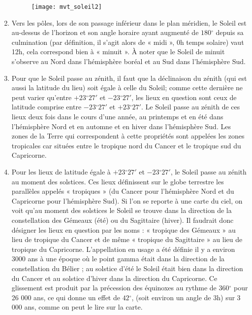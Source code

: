 \documentclass[a4paper,10pt]{report}
\renewcommand{\deg}{\ensuremath{^{\circ}}}
\begin{document}
\begin{Answer}
\begin{enumerate}
    \begin{figure}%
      \centering
      \texttt{[image: mvt\_soleil2]}
      \label{mvtsolaire2}
      \caption{}
    \end{figure}

  \item Vers les pôles, lors de son passage inférieur dans le plan
    méridien, le Soleil est au-dessus de l'horizon et son angle
    horaire ayant augmenté de $180\deg$ depuis sa culmination (par
    définition, il s'agit alors de « midi », 0h temps solaire) vaut
    12h, cela correspond bien à « minuit ». À noter que le Soleil de
    minuit s'observe au Nord dans l'hémisphère boréal et au Sud dans
    l'hémisphère Sud.

  \item Pour que le Soleil passe au zénith, il faut que la déclinaison
    du zénith (qui est aussi la latitude du lieu) soit égale à celle
    du Soleil; comme cette dernière ne peut varier qu'entre
    $+23\deg27'$ et $-23\deg27'$, les lieux en question sont ceux
    de latitude comprise entre $-23\deg27'$ et $+23\deg27'$. Le
    Soleil passe au zénith de ces lieux deux fois dans le cours d'une
    année, au printemps et en été dans l'hémisphère Nord et en automne
    et en hiver dans l'hémisphère Sud. Les zones de la Terre qui
    correspondent à cette propriétés sont appelées les zones
    tropicales car situées entre le tropique nord du Cancer et le
    tropique sud du Capricorne.

  \item Pour les lieux de latitude égale à $+23\deg27'$ et
    $-23\deg27'$, le Soleil passe au zénith au moment des
    solstices. Ces lieux définissent sur le globe terrestre les
    parallèles appelés « tropiques » (du Cancer pour l'hémisphère Nord
    et du Capricorne pour l'hémisphère Sud). Si l'on se reporte à une
    carte du ciel, on voit qu'au moment des solstices le Soleil se
    trouve dans la direction de la constellation des Gémeaux (été) ou
    du Sagittaire (hiver). Il faudrait donc désigner les lieux en
    question par les noms : « tropique des Gémeaux » au lieu de
    tropique du Cancer et de même « tropique du Sagittaire » au lieu
    de tropique du Capricorne. L'appellation en usage a été définie il
    y a environ 3000 ans à une époque où le point gamma était dans la
    direction de la constellation du Bélier ; au solstice d'été le
    Soleil était bien dans la direction du Cancer et au solstice
    d'hiver dans la direction du Capricorne. Ce glissement est produit
    par la précession des équinoxes au rythme de $360\deg$ pour 26
    000 ans, ce qui donne un effet de $42\deg$, (soit environ un
    angle de 3h) sur 3 000 ans, comme on peut le lire sur la carte.
\end{enumerate}
\end{Answer}
\end{document}
